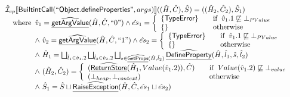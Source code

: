 \[\begin{array}{l}
\aI _{cp}\lbr \SF{BuiltintCall}(``\SF{Object.defineProperties}",args)\rbr((\hat{H},\hat{C}), \hat{S})
  = ((\hat{H}_2, \hat{C}_2), \hat{S}_1)\\
\quad\wherec{
  \hat{v}_1 =\ahf{getArgValue}(\hat{H}, \hat{C}, ``0")
  \land \hat{es}_1 =
    \left\{
    \begin{array}{l@{\quad\quad}l}
      \{ \SF{TypeError} \} & \ifc{\hat{v}_1.1 \not\sqsubseteq \bot_{PValue}}\\
      \{ \}& \owc\\
    \end{array}
    \right.\\
  \land\ \hat{v}_2 =\ahf{getArgValue}(\hat{H}, \hat{C}, ``1")
  \land \hat{es}_2 =
    \left\{
    \begin{array}{l@{\quad\quad}l}
      \{ \SF{TypeError} \} & \ifc{\hat{v}_1.1 \not\sqsubseteq \bot_{PValue}}\\
      \{ \}& \owc\\
    \end{array}
    \right.\\
  \land\ \hat{H}_1 = \bigsqcup_{\hat{l}_1 \in \hat{v}_1.2} \bigsqcup_{\hat{l}_2 \in \hat{v}_2.2}
    \bigsqcup_{s \in \ahf{GetProps}(\hat{H}, \hat{l}_2)}
    \ahf{DefineProperty}(\hat{H}, \hat{l}_1, \hat{s}, \hat{l}_2)\\
  \land\ (\hat{H}_2, \hat{C}_2) = 
    \left\{\begin{array}{l@{\quad\quad}l}
      (\ahf{ReturnStore}(\hat{H}_1, Value(\hat{v}_1.2)), \hat{C})
      & \ifc{Value(\hat{v}_1.2) \not\sqsubseteq \bot_{value}}\\
      (\bot_{heap}, \bot_{context}) & \owc \\
    \end{array}\right.\\
  \land\ \hat{S}_1 = \hat{S} \sqcup \ahf{RaiseException}(\hat{H}, \hat{C}, \hat{es}_1 \sqcup \hat{es}_2)\\
  }\\
\\\\ 



\end{array}
\]
